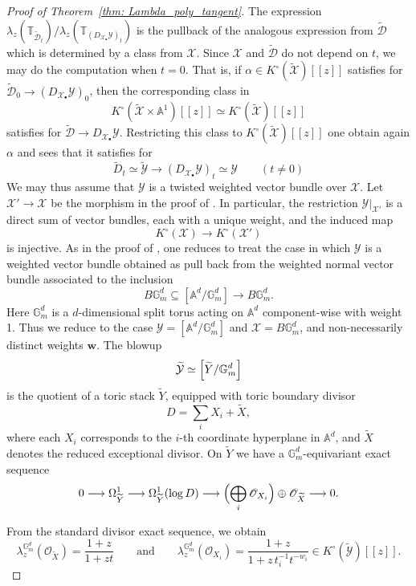 \documentclass[12pt]{amsart}
\newcommand\Gm{\mathbb{G}_m}
\newcommand\A{\mathbb{A}}
\newcommand\tX{\widetilde{X}}
\newcommand{\bT}{\mathbb{T}}
\newcommand{\sO}{\mathscr{O}}
\newcommand{\cD}{\mathcal{D}}
\newcommand{\cX}{\mathcal{X}}
\newcommand{\cY}{\mathcal{Y}}
\newcommand{\Kring}{K^{\circ}}
\theoremstyle{definition}
\begin{document}
\begin{proof}[Proof of Theorem~\ref{thm: Lambda_poly_tangent}]
The expression $\lambda_z(\bT_{\widetilde{\cD}_t})/\lambda_z(\bT_{({D_{\cX_\bullet}\cY})_t})$ is the pullback of the analogous expression from $\widetilde{\cD}$ which is determined by a class from $\cX$. Since $\cX$ and $\widetilde{\cD}$ do not depend on $t$, we may do the computation when $t=0$. That is, if $\alpha \in \Kring(\widetilde{\cX})[\![z]\!]$ satisfies  for
$\widetilde{\cD}_0 \to (D_{\cX_\bullet}\cY)_0$, then the corresponding class in
\[
\Kring(\widetilde{\cX}\times\mathbb{A}^1)[\![z]\!] \simeq \Kring(\widetilde{\cX})[\![z]\!]
\]
satisfies  for
$\widetilde{\cD} \to D_{\cX_\bullet}\cY$. Restricting this class to
$\Kring(\widetilde{\cX})[\![z]\!]$ one obtain again $\alpha$ and sees that it satisfies
 for
\[
\widetilde{D}_t \simeq \widetilde{\cY} \longrightarrow (D_{\cX_\bullet}\cY)_t \simeq \cY \qquad (t \neq 0)
\]
We may thus assume that $\cY$ is a twisted weighted vector bundle over $\cX$. Let $\cX'\to\cX$ be the morphism in the proof of . In particular, the restriction $\cY|_{\cX'}$ is a direct sum of vector bundles, each with a unique weight, and the induced map 
\[
\Kring(\cX) \longrightarrow \Kring(\cX')
\]
is injective. As in the proof of , one reduces to treat the case in which $\cY$ is a weighted vector bundle obtained as pull back from the weighted normal vector bundle associated to the inclusion
\[
    B\Gm^d \subseteq [\mathbb{A}^d/\Gm^d] \longrightarrow B \Gm^d.
\]
Here $\Gm^d$ is a $d$-dimensional split torus acting on $\mathbb{A}^d$ component-wise with weight 1. Thus we reduce to the case $\cY=[\A^d/\Gm^d]$ and $\cX=B\Gm^d$, and non-necessarily distinct weights $\mathbf{w}$.
The blowup
\[
\widetilde{\cY} \simeq \Bigl[\widetilde{Y}/\Gm^d\Bigr]
\]
is the quotient of a toric stack $\widetilde{Y}$, equipped with toric boundary divisor
\[
D = \sum_i X_i + \tX,
\]
where each $X_i$ corresponds to the $i$-th coordinate hyperplane in $\mathbb{A}^d$, and $\tX$ denotes the reduced exceptional divisor. On $\widetilde{Y}$ we have a $\Gm^d$-equivariant exact sequence
\[
0 \longrightarrow \Omega_{\widetilde{Y}}^1
\longrightarrow \Omega_{\widetilde{Y}}^1(\log D)
\longrightarrow \Bigl( \bigoplus_{i} \sO_{X_i} \Bigr) \oplus \sO_{\widetilde{X}}
\longrightarrow 0.
\]

From the standard divisor exact sequence, we obtain
\[
\lambda_z^{\Gm^d}(\sO_{\widetilde{X}})
= \frac{1+z}{1+zt}
\qquad \text{and} \qquad
\lambda_z^{\Gm^d}(\sO_{X_i})
= \frac{1+z}{1+z\,t_i^{-1}t^{-w_i}} \in \Kring(\widetilde{\cY})[\![ z ]\!].
\]


\end{proof}
\end{document}
